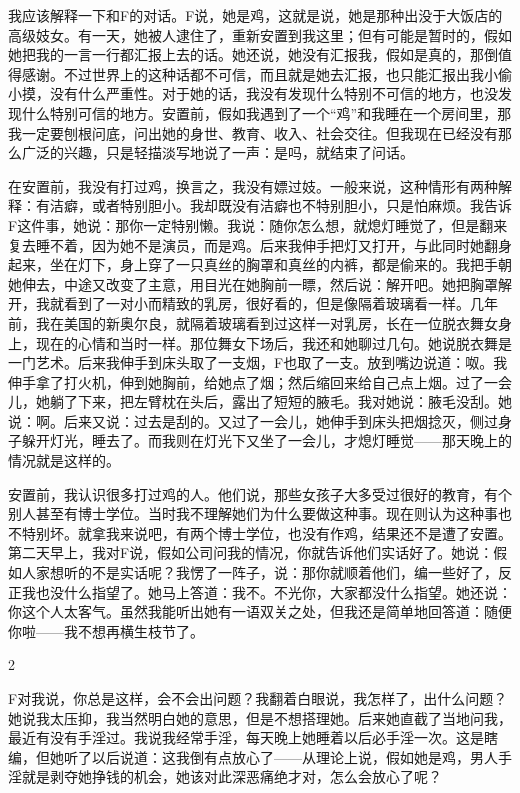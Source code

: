 我应该解释一下和F的对话。F说，她是鸡，这就是说，她是那种出没于大饭店的高级妓女。有一天，她被人逮住了，重新安置到我这里；但有可能是暂时的，假如她把我的一言一行都汇报上去的话。她还说，她没有汇报我，假如是真的，那倒值得感谢。不过世界上的这种话都不可信，而且就是她去汇报，也只能汇报出我小偷小摸，没有什么严重性。对于她的话，我没有发现什么特别不可信的地方，也没发现什么特别可信的地方。安置前，假如我遇到了一个“鸡”和我睡在一个房间里，那我一定要刨根问底，问出她的身世、教育、收入、社会交往。但我现在已经没有那么广泛的兴趣，只是轻描淡写地说了一声：是吗，就结束了问话。 

在安置前，我没有打过鸡，换言之，我没有嫖过妓。一般来说，这种情形有两种解释：有洁癖，或者特别胆小。我却既没有洁癖也不特别胆小，只是怕麻烦。我告诉F这件事，她说：那你一定特别懒。我说：随你怎么想，就熄灯睡觉了，但是翻来复去睡不着，因为她不是演员，而是鸡。后来我伸手把灯又打开，与此同时她翻身起来，坐在灯下，身上穿了一只真丝的胸罩和真丝的内裤，都是偷来的。我把手朝她伸去，中途又改变了主意，用目光在她胸前一瞟，然后说：解开吧。她把胸罩解开，我就看到了一对小而精致的乳房，很好看的，但是像隔着玻璃看一样。几年前，我在美国的新奥尔良，就隔着玻璃看到过这样一对乳房，长在一位脱衣舞女身上，现在的心情和当时一样。那位舞女下场后，我还和她聊过几句。她说脱衣舞是一门艺术。后来我伸手到床头取了一支烟，F也取了一支。放到嘴边说道：呶。我伸手拿了打火机，伸到她胸前，给她点了烟；然后缩回来给自己点上烟。过了一会儿，她躺了下来，把左臂枕在头后，露出了短短的腋毛。我对她说：腋毛没刮。她说：啊。后来又说：过去是刮的。又过了一会儿，她伸手到床头把烟捻灭，侧过身子躲开灯光，睡去了。而我则在灯光下又坐了一会儿，才熄灯睡觉——那天晚上的情况就是这样的。

安置前，我认识很多打过鸡的人。他们说，那些女孩子大多受过很好的教育，有个别人甚至有博士学位。当时我不理解她们为什么要做这种事。现在则认为这种事也不特别坏。就拿我来说吧，有两个博士学位，也没有作鸡，结果还不是遭了安置。第二天早上，我对F说，假如公司问我的情况，你就告诉他们实话好了。她说：假如人家想听的不是实话呢？我愣了一阵子，说：那你就顺着他们，编一些好了，反正我也没什么指望了。她马上答道：我不。不光你，大家都没什么指望。她还说：你这个人太客气。虽然我能听出她有一语双关之处，但我还是简单地回答道：随便你啦——我不想再横生枝节了。 

2 

F对我说，你总是这样，会不会出问题？我翻着白眼说，我怎样了，出什么问题？她说我太压抑，我当然明白她的意思，但是不想搭理她。后来她直截了当地问我，最近有没有手淫过。我说我经常手淫，每天晚上她睡着以后必手淫一次。这是瞎编，但她听了以后说道：这我倒有点放心了——从理论上说，假如她是鸡，男人手淫就是剥夺她挣钱的机会，她该对此深恶痛绝才对，怎么会放心了呢？ 

